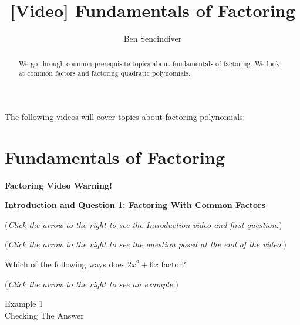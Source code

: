 \documentclass{ximera}
\title[Prerequisite Videos: ]{[Video] Fundamentals of Factoring}
\author{Ben Sencindiver}
\begin{document}
\begin{abstract}
  We go through common prerequisite topics about fundamentals of factoring. 
  We look at common factors and factoring quadratic polynomials.
\end{abstract}
\maketitle

The following videos will cover topics about factoring polynomials: 

\section{Fundamentals of Factoring}
\textbf{Factoring Video Warning!}


\textbf{Introduction and Question 1: Factoring With Common Factors}
\begin{question}
\begin{flushright}
{\color{blue}(\emph{Click the arrow to the right to see the Introduction video and first question.})}
\end{flushright}
\begin{center}
\begin{expandable}
{\color{blue}(\emph{Click the arrow to the right to see the  question
posed at the end of the video.})}
\begin{expandable}
Which of the following ways does $2x^2 + 6x$ factor?
\begin{multipleChoice}
\end{multipleChoice}
\begin{flushright}
{\color{blue}(\emph{Click the arrow to the right to see an example.})}
\end{flushright}
\begin{expandable}
Example 1
\\

Checking The Answer
\end{expandable}
\end{expandable}
\end{expandable}
\end{center}
\end{question}
\end{document}
